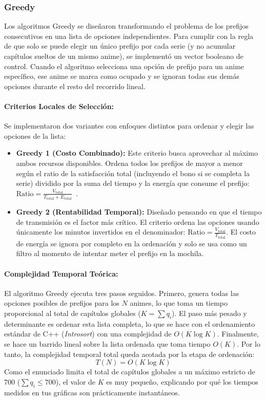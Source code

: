 \subsubsection{Greedy}

Los algoritmos Greedy se diseñaron transformando el problema de los prefijos consecutivos en una lista de opciones independientes. Para cumplir con la regla de que solo se puede elegir un único prefijo por cada serie (y no acumular capítulos sueltos de un mismo anime), se implementó un vector booleano de control. Cuando el algoritmo selecciona una opción de prefijo para un anime específico, ese anime se marca como ocupado y se ignoran todas sus demás opciones durante el resto del recorrido lineal.

\paragraph{Criterios Locales de Selección:}
Se implementaron dos variantes con enfoques distintos para ordenar y elegir las opciones de la lista:
\begin{itemize}
    \item \textbf{Greedy 1 (Costo Combinado):} Este criterio busca aprovechar al máximo ambos recursos disponibles. Ordena todos los prefijos de mayor a menor según el ratio de la satisfacción total (incluyendo el bono si se completa la serie) dividido por la suma del tiempo y la energía que consume el prefijo: $\text{Ratio} = \frac{V_{\text{total}}}{T_{\text{total}} + E_{\text{total}}}$~\cite{geeks_fractional_greedy}.
    \item \textbf{Greedy 2 (Rentabilidad Temporal):} Diseñado pensando en que el tiempo de transmisión es el factor más crítico. El criterio ordena las opciones usando únicamente los minutos invertidos en el denominador: $\text{Ratio} = \frac{V_{\text{total}}}{T_{\text{total}}}$. El costo de energía se ignora por completo en la ordenación y solo se usa como un filtro al momento de intentar meter el prefijo en la mochila.
\end{itemize}

\paragraph{Complejidad Temporal Teórica:}
El algoritmo Greedy ejecuta tres pasos seguidos. Primero, genera todas las opciones posibles de prefijos para los $N$ animes, lo que toma un tiempo proporcional al total de capítulos globales ($K = \sum q_i$). El paso más pesado y determinante es ordenar esta lista completa, lo que se hace con el ordenamiento estándar de C++ (\textit{Introsort}) con una complejidad de $O(K \log K)$. Finalmente, se hace un barrido lineal sobre la lista ordenada que toma tiempo $O(K)$. Por lo tanto, la complejidad temporal total queda acotada por la etapa de ordenación:
\begin{equation}
T(N) = O(K \log K)
\end{equation}
Como el enunciado limita el total de capítulos globales a un máximo estricto de 700 ($\sum q_i \le 700$), el valor de $K$ es muy pequeño, explicando por qué los tiempos medidos en tus gráficas son prácticamente instantáneos.

